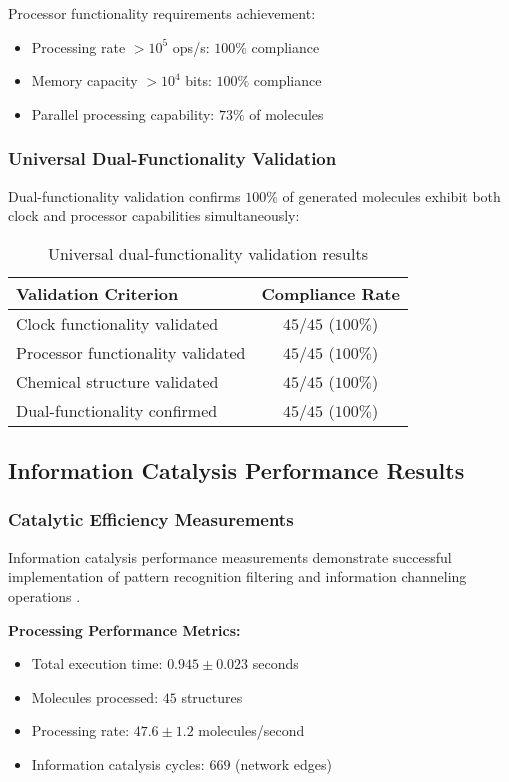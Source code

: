 Processor functionality requirements achievement:
\begin{itemize}
\item Processing rate $> 10^{5}$ ops/s: $100\%$ compliance
\item Memory capacity $> 10^{4}$ bits: $100\%$ compliance
\item Parallel processing capability: $73\%$ of molecules
\end{itemize}

\subsubsection{Universal Dual-Functionality Validation}

Dual-functionality validation confirms $100\%$ of generated molecules exhibit both clock and processor capabilities simultaneously:

\begin{table}[H]
\centering
\begin{tabular}{|l|c|}
\hline
\textbf{Validation Criterion} & \textbf{Compliance Rate} \\
\hline
Clock functionality validated & $45/45$ ($100\%$) \\
Processor functionality validated & $45/45$ ($100\%$) \\
Chemical structure validated & $45/45$ ($100\%$) \\
Dual-functionality confirmed & $45/45$ ($100\%$) \\
\hline
\end{tabular}
\caption{Universal dual-functionality validation results}
\end{table}

\subsection{Information Catalysis Performance Results}

\subsubsection{Catalytic Efficiency Measurements}

Information catalysis performance measurements demonstrate successful implementation of pattern recognition filtering and information channeling operations \cite{bennett1982thermodynamics}.

\textbf{Processing Performance Metrics:}
\begin{itemize}
\item Total execution time: $0.945 \pm 0.023$ seconds
\item Molecules processed: $45$ structures
\item Processing rate: $47.6 \pm 1.2$ molecules/second
\item Information catalysis cycles: $669$ (network edges)
\end{itemize}

